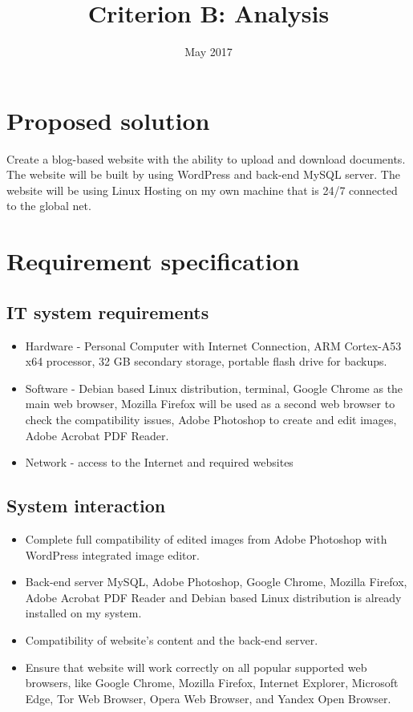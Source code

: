 \documentclass[a4paper, 12pt]{article}
\title{Criterion B: Analysis}
\date{May 2017}
\begin{document}
\maketitle

\section*{Proposed solution}

Create a blog-based website with the ability to upload and download documents. The website will be built by using WordPress and back-end MySQL server. The website will be using Linux Hosting on my own machine that is 24/7 connected to the global net. 
\section*{Requirement specification}

\subsection*{IT system requirements}

\begin{itemize}
    \item Hardware - Personal Computer with Internet Connection, ARM Cortex-A53 x64 processor, 32 GB secondary storage, portable flash drive for backups.
    \item Software - Debian based Linux distribution, terminal, Google Chrome as the main web browser, Mozilla Firefox will be used as a second web browser to check the compatibility issues, Adobe Photoshop to create and edit images, Adobe Acrobat PDF Reader.
    \item Network - access to the Internet and required websites 
\end{itemize}

\subsection*{System interaction}

\begin{itemize}
    \item Complete full compatibility of edited images from Adobe Photoshop with WordPress integrated image editor.
    \item Back-end server MySQL, Adobe Photoshop, Google Chrome, Mozilla Firefox, Adobe Acrobat PDF Reader and Debian based Linux distribution is already installed on my system.
    \item Compatibility of website’s content and the back-end server.
    \item Ensure that website will work correctly on all popular supported web browsers, like Google Chrome, Mozilla Firefox, Internet Explorer, Microsoft Edge, Tor Web Browser, Opera Web Browser, and Yandex Open Browser.
\end{itemize}
\end{document}
